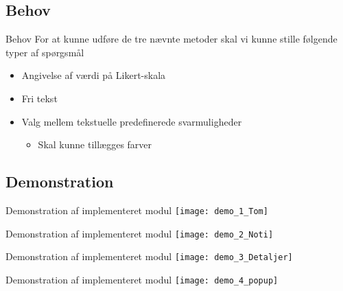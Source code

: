 \subsection{Behov}
{ %
\begin{frame}{Behov} %
For at kunne udføre de tre nævnte metoder skal vi kunne stille følgende typer af spørgsmål


\begin{itemize}
	\item Angivelse af værdi på Likert-skala
	\item Fri tekst
	\item Valg mellem tekstuelle predefinerede svarmuligheder
	\begin{itemize}
		\item Skal kunne tillægges farver
	\end{itemize}
\end{itemize}
\end{frame}}

\subsection{Demonstration}
\begin{frame}{Demonstration af implementeret modul} %
\centering
\texttt{[image: demo\_1\_Tom]}
\end{frame}

\begin{frame}{Demonstration af implementeret modul} %
	\centering
	\texttt{[image: demo\_2\_Noti]}
\end{frame}

\begin{frame}{Demonstration af implementeret modul} %
	\centering
	\texttt{[image: demo\_3\_Detaljer]}
\end{frame}

\begin{frame}{Demonstration af implementeret modul} %
	\centering
	\texttt{[image: demo\_4\_popup]}
\end{frame}